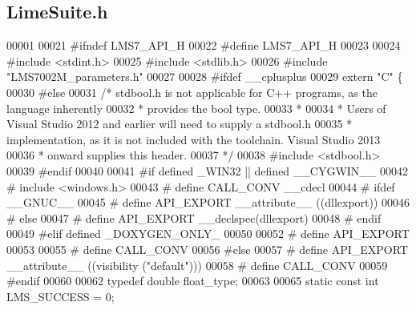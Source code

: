 \subsection{Lime\+Suite.\+h}
\label{LimeSuite_8h_source}

\begin{DoxyCode}
00001 
00021 \textcolor{preprocessor}{#ifndef LMS7\_API\_H}
00022 \textcolor{preprocessor}{#define LMS7\_API\_H}
00023 
00024 \textcolor{preprocessor}{#include <stdint.h>}
00025 \textcolor{preprocessor}{#include <stdlib.h>}
00026 \textcolor{preprocessor}{#include "LMS7002M_parameters.h"}
00027 
00028 \textcolor{preprocessor}{#ifdef \_\_cplusplus}
00029 \textcolor{keyword}{extern} \textcolor{stringliteral}{"C"} \{
00030 \textcolor{preprocessor}{#else}
00031 \textcolor{comment}{/* stdbool.h is not applicable for C++ programs, as the language inherently}
00032 \textcolor{comment}{ * provides the bool type.}
00033 \textcolor{comment}{ *}
00034 \textcolor{comment}{ * Users of Visual Studio 2012 and earlier will need to supply a stdbool.h}
00035 \textcolor{comment}{ * implementation, as it is not included with the toolchain. Visual Studio 2013}
00036 \textcolor{comment}{ * onward supplies this header.}
00037 \textcolor{comment}{ */}
00038 \textcolor{preprocessor}{#include <stdbool.h>}
00039 \textcolor{preprocessor}{#endif}
00040 
00041 \textcolor{preprocessor}{#if defined \_WIN32 || defined \_\_CYGWIN\_\_}
00042 \textcolor{preprocessor}{#   include <windows.h>}
00043 \textcolor{preprocessor}{#   define CALL\_CONV \_\_cdecl}
00044 \textcolor{preprocessor}{#   ifdef \_\_GNUC\_\_}
00045 \textcolor{preprocessor}{#       define API\_EXPORT \_\_attribute\_\_ ((dllexport))}
00046 \textcolor{preprocessor}{#   else}
00047 \textcolor{preprocessor}{#       define API\_EXPORT \_\_declspec(dllexport)}
00048 \textcolor{preprocessor}{#   endif}
00049 \textcolor{preprocessor}{#elif defined \_DOXYGEN\_ONLY\_}
00050 
00052 \textcolor{preprocessor}{#   define API\_EXPORT}
00053 
00055 \textcolor{preprocessor}{#   define CALL\_CONV}
00056 \textcolor{preprocessor}{#else}
00057 \textcolor{preprocessor}{#   define API\_EXPORT \_\_attribute\_\_ ((visibility ("default")))}
00058 \textcolor{preprocessor}{#   define CALL\_CONV}
00059 \textcolor{preprocessor}{#endif}
00060 
00062 \textcolor{keyword}{typedef} \textcolor{keywordtype}{double} float_type;
00063 
00065 \textcolor{keyword}{static} \textcolor{keyword}{const} \textcolor{keywordtype}{int} LMS_SUCCESS = 0;

\end{DoxyCode}
